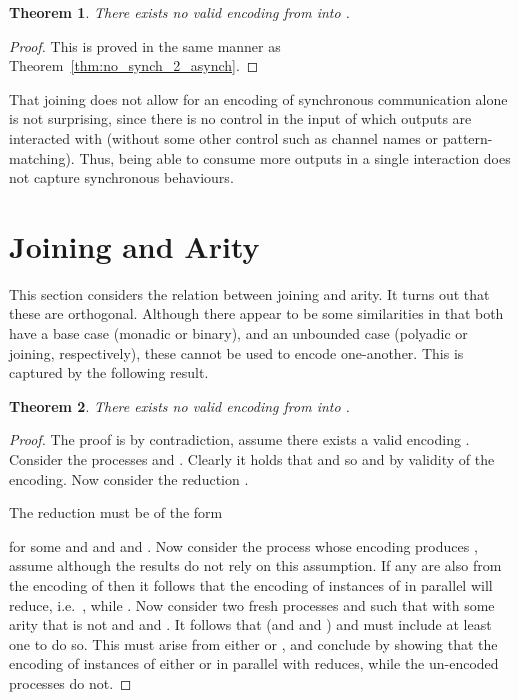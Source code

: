 \documentclass[submission,copyright,creativecommons]{eptcs}
\newtheorem{theorem}{Theorem}[section]
\begin{document}
\begin{theorem}
There exists no valid encoding from  into .
\end{theorem}
\begin{proof}
This is proved in the same manner as Theorem~\ref{thm:no_synch_2_asynch}.
\end{proof}

That joining does not allow for an encoding of synchronous communication alone is not surprising,
since there is no control in the input of which outputs are interacted with (without some other
control such as channel names or pattern-matching). Thus, being able to consume more outputs in
a single interaction does not capture synchronous behaviours.



\section{Joining and Arity}
\label{sec:join_arity}

This section considers the relation between joining and arity. It turns out that these are
orthogonal.
Although there appear to be some similarities in that both have a base case (monadic or binary),
and an unbounded case (polyadic or joining, respectively), these cannot be used to encode one-another.
This is captured by the following result.


\begin{theorem}
\label{thm:no_poly_2_join}
There exists no valid encoding from  into .
\end{theorem}
\begin{proof}
The proof is by contradiction, assume there exists a valid encoding .
Consider the  processes  and .
Clearly it holds that  and so  and 
by validity of the encoding. Now consider the reduction .

The reduction must be of the form

for some  and  and  and .
Now consider the process whose encoding produces ,
assume  although the results do not rely on this assumption.
If any  are also from the encoding of  then it follows that the encoding of
 instances of  in parallel will reduce, i.e.~, while
.
Now consider two fresh processes  and  such that  with some arity that is not 
and  and .
It follows that  (and  and )
and  must include at least one  to do so.
This  must arise from either  or , and conclude by showing that
the encoding of  instances of either  or  in parallel with  reduces, while the
un-encoded processes do not.
\end{proof}
\end{document}
